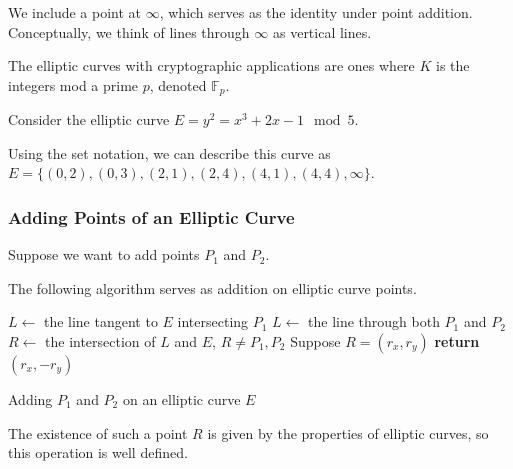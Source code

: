 We include a point at
$\infty$, which serves as the identity under point addition.
Conceptually, we think of lines through $\infty$
as vertical lines.

The elliptic curves with cryptographic applications are ones where $K$ is the integers
mod a prime $p$, denoted $\mathbb{F}_p$.

\begin{example}
    Consider the elliptic curve $E = y^2 = x^3+2x-1 \mod 5$.

    Using the set notation, we can describe this curve as
    $E = \{(0 ,2 ),(0,3),(2,1),(2 ,4 ),(4,1),(4,4), \infty\}$.
\end{example}




\subsubsection{Adding Points of an Elliptic Curve}
Suppose we want to add points $P_1$ and $P_2$.

The following algorithm serves as addition on elliptic curve points.
\begin{algorithm}
    \begin{algorithmic}
        \State $L \gets$ the line tangent to $E$ intersecting $P_1$
        \Else
        \State $L \gets$ the line through both $P_1$ and $P_2$
        \EndIf
        \State $R \gets$ the intersection of $L$ and $E$, $R \neq P_1, P_2$
        \State Suppose $R = (r_x, r_y)$
        \State \textbf{return} $(r_x, -r_y)$
        \EndProcedure
    \end{algorithmic}
    \caption{Adding $P_1$ and $P_2$ on an elliptic curve $E$}
    \label{euclid}
\end{algorithm}

The existence of such a point $R$ is given by the properties of elliptic curves,
so this operation is well defined.

